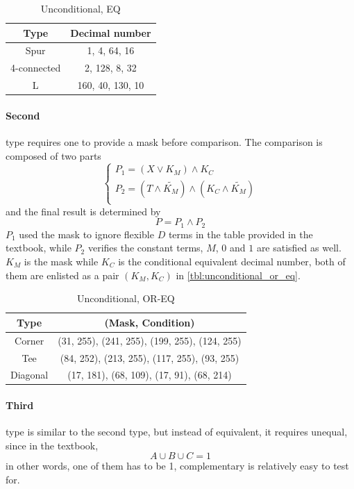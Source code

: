 \documentclass[12pt]{article}
\begin{document}
\begin{table}[H]
\caption{Unconditional, EQ}
	\centering
	\begin{tabular}{c|c}	
	Type & Decimal number \\
	\hline
	\hline
	Spur & 1, 4, 64, 16\\
	4-connected & 2, 128, 8, 32\\
	L & 160, 40, 130, 10
	\end{tabular}
	\label{tbl:unconditional_eq}
\end{table}

\paragraph{Second} type requires one to provide a mask before comparison.
The comparison is composed of two parts
\begin{equation}
\begin{cases}
	P_1 = (X \vee K_M) \wedge K_C \\
	P_2 = (T \wedge \tilde{K_M}) \wedge (K_C \wedge \tilde{K_M})\\
\end{cases}
\label{eq:unconditional_or_eq_eq}
\end{equation}
and the final result is determined by 
\begin{equation}
	P = P_1 \wedge P_2
\end{equation}
$P_1$ used the mask to ignore flexible $D$ terms in the table provided in the textbook, while $P_2$ verifies the constant terms, $M$, $0$ and $1$ are satisfied as well.
$K_M$ is the mask while $K_C$ is the conditional equivalent decimal number, both of them are enlisted as a pair $(K_M, K_C)$ in \autoref{tbl:unconditional_or_eq}.

\begin{table}[H]
\caption{Unconditional, OR-EQ}
	\centering
	\begin{tabular}{c|c}	
	Type & (Mask, Condition) \\
	\hline
	\hline
	Corner & (31, 255), (241, 255), (199, 255), (124, 255) \\
	Tee & (84, 252), (213, 255), (117, 255), (93, 255) \\
	Diagonal & (17, 181), (68, 109), (17, 91), (68, 214)\\
	\end{tabular}
	\label{tbl:unconditional_or_eq}
\end{table}

\paragraph{Third} type is similar to the second type, but instead of equivalent, it requires unequal, since in the textbook, 
\begin{equation}
	A \cup B \cup C = 1
\end{equation}
in other words, one of them has to be 1, complementary is relatively easy to test for.
\end{document}

